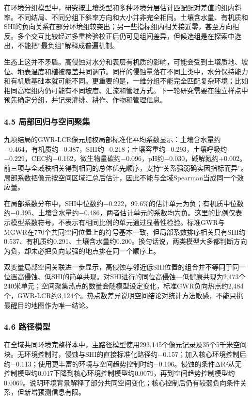 \documentclass[
  10.5pt,
]{article}
\begin{document}
在环境分组模型中，研究按土壤类型和多种环境分层估计匹配配对差值的组内斜率。不同结局、不同分组下斜率方向和大小并非完全相同。土壤含水量、有机质和SHI的负向关系在部分环境组较突出；另一些指标组内相关接近零，甚至方向相反。多个交互比较经过多重检验校正后仍可见组间差异，但候选组是在探索中选出，不能把``最负组''解释成普遍机制。

生态上这并不矛盾。高侵蚀对水分和表层有机质的影响，可能会受到土壤质地、坡位、地表温度和植被覆盖共同调节。同样的侵蚀量落在不同土类中，水分保持能力和有机质基础本就可能不同。更重要的是，一维分组不能完全匹配复杂环境；比如相同高程组内仍可能有不同坡度、汇流和管理方式。下一轮研究需要在独立样点中预先确定分组，并记录灌排、耕作、作物和管理信息。

\hypertarget{ux5c40ux90e8ux56deux5f52ux4e0eux7a7aux95f4ux805aux96c6}{%
\subsubsection{4.5
局部回归与空间聚集}\label{ux5c40ux90e8ux56deux5f52ux4e0eux7a7aux95f4ux805aux96c6}}

九项结局的GWR-LCR像元加权局部标准化平均系数显示：土壤含水量约−0.464，有机质约−0.387，SHI约−0.218；土壤容重约−0.293，土壤呼吸约−0.229，CEC约−0.162，微生物量碳约−0.096，pH约−0.030，碱解氮约+0.002。前三项与全域秩相关得到相同的总体优先顺序，支持``关系强弱确实因指标而异''。局部系数把像元按空间区域汇总后估计，因此不能与全域Spearman当成同一个效应量。

在局部系数分布中，SHI中位数约−0.222，99.6\%的估计单元为负；有机质中位数约−0.395、土壤含水量约−0.486，两者估计单元的系数均为负。这里的比例仅表示模型系数符号，不表示有相同比例的单元通过显著性检验。标准GWR与MGWR在770个共同空间位置上的符号基本一致，但局部系数排序相关只有SHI约0.537、有机质约0.291、土壤含水量约0.200。换句话说，两类模型大多都判断方向为负，却未必把负向最强的地点排在同一个顺序上。

双变量局部空间关联进一步显示，高侵蚀与邻近低SHI位置的组合并不等同于同一位置高侵蚀、低SHI的简单共现。对SHI进行的同位高侵蚀---低健康共现为2,473个240米单元；空间聚集热点的数量会随模型设定变化，标准GWR负向热点约2,484个，GWR-LCR约3,124个。热点数差异说明空间结论对统计方法敏感，不能只挑最醒目的地图作为唯一结论。

\hypertarget{ux8defux5f84ux6a21ux578b}{%
\subsubsection{4.6 路径模型}\label{ux8defux5f84ux6a21ux578b}}

在全域共同环境完整样本中，主路径模型使用293,145个像元记录及35个5千米空间块。无环境控制时，侵蚀与SHI的直接标准化路径约−0.157；加入核心环境控制后约−0.113；使用更丰富的环境与空间趋势控制时约−0.106。侵蚀的条件ΔR²从无控制模型约0.017下降到核心环境控制模型约0.0079，再到空间趋势控制模型约0.0069。说明环境背景解释了部分共同空间变化；核心控制后仍有较弱负向条件关系，但新增预测信息有限。
\end{document}
